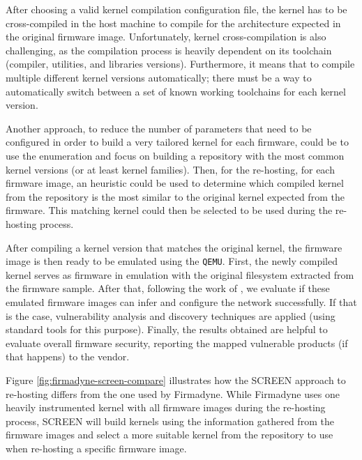 After choosing a valid kernel compilation configuration file, the kernel has to be cross-compiled in the host machine to compile for the architecture expected in the original firmware image. Unfortunately, kernel cross-compilation is also challenging, as the compilation process is heavily dependent on its toolchain (compiler, utilities, and libraries versions). Furthermore, it means that to compile multiple different kernel versions automatically; there must be a way to automatically switch between a set of known working toolchains for each kernel version.

Another approach, to reduce the number of parameters that need to be configured in order to build a very tailored kernel for each firmware, could be to use the enumeration and focus on building a repository with the most common kernel versions (or at least kernel families). Then, for the re-hosting, for each firmware image, an heuristic could be used to determine which compiled kernel from the repository is the most similar to the original kernel expected from the firmware. This matching kernel could then be selected to be used during the re-hosting process.

After compiling a kernel version that matches the original kernel, the firmware image is then ready to be emulated using the {\tt QEMU}. First, the newly compiled kernel serves as firmware in emulation with the original filesystem extracted from the firmware sample. After that, following the work of \cite{firmadyne}, we evaluate if these emulated firmware images can infer and configure the network successfully. If that is the case, vulnerability analysis and discovery techniques are applied (using standard tools for this purpose). Finally, the results obtained are helpful to evaluate overall firmware security, reporting the mapped vulnerable products (if that happens) to the vendor.

Figure \ref{fig:firmadyne-screen-compare} illustrates how the SCREEN approach to re-hosting differs from the one used by Firmadyne. While Firmadyne uses one heavily instrumented kernel with all firmware images during the re-hosting process, SCREEN will build kernels using the information gathered from the firmware images and select a more suitable kernel from the repository to use when re-hosting a specific firmware image.

